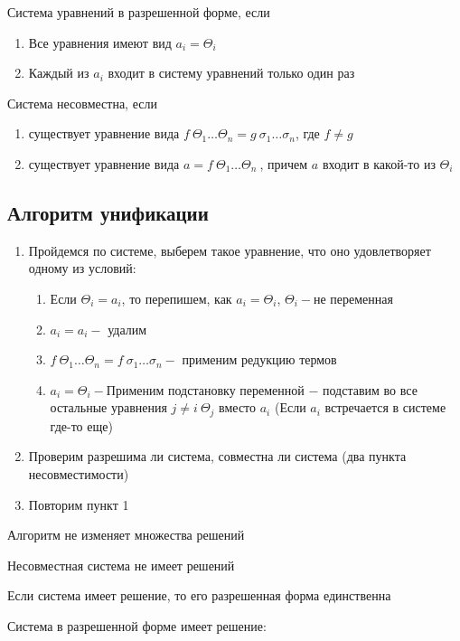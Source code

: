 		\begin{definition}Система уравнений в разрешенной форме, если \end{definition}
			\begin{enumerate}
				\item Все уравнения имеют вид $a_i=\Theta_i$
				\item Каждый из $a_i$ входит в систему уравнений только один раз
			\end{enumerate}
		\begin{definition}Система несовместна, если\end{definition}
		\begin{enumerate}
			\item существует уравнение вида $f\:\Theta_1\hdots\Theta_n=g\:\sigma_1\hdots\sigma_n$, где $f\neq g$
			\item существует уравнение вида $a=f\:\Theta_1\hdots\Theta_n\:$, причем $a$ входит в какой-то из $\Theta_i$
		\end{enumerate}			

    \subsection{ Алгоритм унификации}
		\begin{enumerate}
		\item Пройдемся по системе, выберем такое уравнение, что оно удовлетворяет одному из условий:\begin{enumerate}
			\item Если $\Theta_i=a_i$, то перепишем, как $a_i=\Theta_i$, $\Theta_i-$не переменная
			\item $a_i=a_i-$ удалим
			\item $f\:\Theta_1\hdots\Theta_n=f\:\sigma_1\hdots\sigma_n-$  применим редукцию термов 
			\item $a_i=\Theta_i-$Применим подстановку переменной $-$ подставим во все остальные уравнения $j \neq i\ \Theta_j$ вместо $a_i$ (Если $a_i$ встречается в системе где-то еще)
		\end{enumerate}
		\item Проверим разрешима ли система, совместна ли система (два пункта несовместимости)
		\item Повторим пункт 1 		
		\end{enumerate}

		\begin{statement} Алгоритм не изменяет множества решений\end{statement}
		\begin{statement} Несовместная система не имеет решений\end{statement}
		\begin{statement} Если система имеет решение, то его разрешенная форма единственна\end{statement}
		\begin{statement} Система в разрешенной форме имеет решение:\end{statement}	
		
